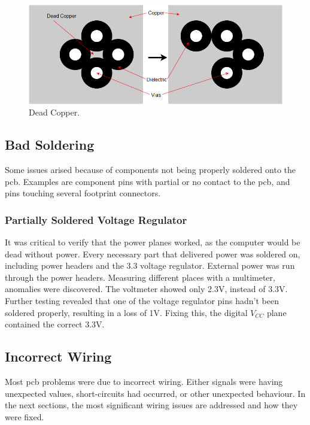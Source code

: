 \begin{figure}[h!]
\centering
\includegraphics[scale = 0.4]{images/Dead_Copper.png}
\caption{Dead Copper.}
\label{fig:Dead copper}
\end{figure}

\subsection{Bad Soldering}
Some issues arised because of components not being properly soldered onto the \gls{pcb}. Examples are component pins with partial or no contact to the \gls{pcb}, and pins touching several footprint connectors.

\subsubsection{Partially Soldered Voltage Regulator}
It was critical to verify that the power planes worked, as the computer would be dead without power.
Every necessary part that delivered power was soldered on, including power headers and the 3.3 voltage regulator.
External power was run through the power headers.
Measuring different places with a multimeter, anomalies were discovered.
The voltmeter showed only 2.3V, instead of 3.3V.
Further testing revealed that one of the voltage regulator pins hadn't been soldered properly, resulting in a loss of 1V.
Fixing this, the digital \(V_{CC}\) plane contained the correct 3.3V.

\subsection{Incorrect Wiring}
Most \gls{pcb} problems were due to incorrect wiring.
Either signals were having unexpected values, short-circuits had occurred, or other unexpected behaviour.
In the next sections, the most significant wiring issues are addressed and how they were fixed.

